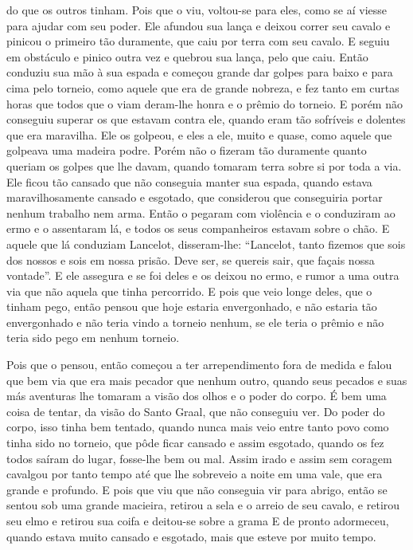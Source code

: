 do que os outros tinham. Pois que o viu, voltou-se para eles, como se aí viesse
para ajudar com seu poder. Ele afundou sua lança e deixou correr seu cavalo e
pinicou o primeiro tão duramente, que caiu por terra com seu cavalo. E seguiu
em obstáculo e pinico outra vez e quebrou sua lança, pelo que caiu. Então
conduziu sua mão à sua espada e começou grande dar golpes para baixo e para
cima pelo torneio, como aquele que era de grande nobreza, e fez tanto em curtas
horas que todos que o viam deram-lhe honra e o prêmio do torneio. E porém não
conseguiu superar os que estavam contra ele, quando eram tão sofríveis e
dolentes que era maravilha. Ele os golpeou, e eles a ele, muito e quase, como
aquele que golpeava uma madeira podre. Porém não o fizeram tão duramente quanto
queriam os golpes que lhe davam, quando tomaram terra sobre si por toda a via.
Ele ficou tão cansado que não conseguia manter sua espada, quando estava
maravilhosamente cansado e esgotado, que considerou que conseguiria portar
nenhum trabalho nem arma. Então o pegaram com violência e o conduziram ao ermo
e o assentaram lá, e todos os seus companheiros estavam sobre o chão. E aquele
que lá conduziam Lancelot, disseram-lhe: “Lancelot, tanto fizemos que sois
dos nossos e sois em nossa prisão. Deve ser, se quereis sair, que façais nossa
vontade”. E ele assegura e se foi deles e os deixou no ermo, e rumor a uma
outra via que não aquela que tinha percorrido. E pois que veio longe deles, que
o tinham pego, então pensou que hoje estaria envergonhado, e não estaria tão
envergonhado e não teria vindo a torneio nenhum, se ele teria o prêmio e não
teria sido pego em nenhum torneio. 

Pois que o pensou, então começou a ter arrependimento fora de medida e falou que
bem via que era mais pecador que nenhum outro, quando seus pecados e suas más
aventuras lhe tomaram a visão dos olhos e o poder do corpo. É bem uma coisa de
tentar, da visão do Santo Graal, que não conseguiu ver. Do poder do corpo, isso
tinha bem tentado, quando nunca mais veio entre tanto povo como tinha sido no
torneio, que pôde ficar cansado e assim esgotado, quando os fez todos saíram do
lugar, fosse-lhe bem ou mal. Assim irado e assim sem coragem cavalgou por tanto
tempo até que lhe sobreveio a noite em uma vale, que era grande e profundo. E
pois que viu que não conseguia vir para abrigo, então se sentou sob uma grande
macieira, retirou a sela e o arreio de seu cavalo, e retirou seu elmo e retirou
sua coifa e deitou-se sobre a grama E de pronto adormeceu, quando estava muito
cansado e esgotado, mais que esteve por muito tempo. 


